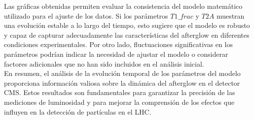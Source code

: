 
\newpage

Las gráficas obtenidas permiten evaluar la consistencia del modelo matemático utilizado para el ajuste de los datos. Si los parámetros $T1\_frac$ y $T2A$ muestran una evolución estable a lo largo del tiempo, esto sugiere que el modelo es robusto y capaz de capturar adecuadamente las características del afterglow en diferentes condiciones experimentales. Por otro lado, fluctuaciones significativas en los parámetros podrían indicar la necesidad de ajustar el modelo o considerar factores adicionales que no han sido incluidos en el análisis inicial.\\

En resumen, el análisis de la evolución temporal de los parámetros del modelo proporciona información valiosa sobre la dinámica del afterglow en el detector CMS. Estos resultados son fundamentales para garantizar la precisión de las mediciones de luminosidad y para mejorar la comprensión de los efectos que influyen en la detección de partículas en el LHC.\\


